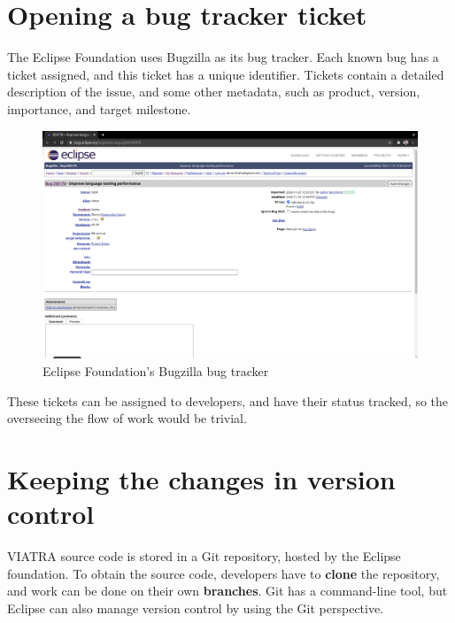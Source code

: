 \documentclass[11pt,a4paper,oneside]{report}
\begin{document}
\section{Opening a bug tracker ticket}
The Eclipse Foundation uses Bugzilla as its bug tracker. Each known bug has a
ticket assigned, and this ticket has a unique identifier. Tickets contain
a detailed description of the issue, and some other metadata, such as product,
version, importance, and target milestone.

\begin{figure}[ht]
\centering
\includegraphics[width=150mm, keepaspectratio]{figures/bugzilla.png}
\caption{Eclipse Foundation's Bugzilla bug tracker}
\label{fig:bugzilla}
\end{figure}

These tickets can be assigned to developers, and have their status tracked, so
the overseeing the flow of work would be trivial.

\section{Keeping the changes in version control}
VIATRA source code is stored in a Git repository, hosted by the Eclipse
foundation. To obtain the source code, developers have to \textbf{clone} the
repository, and work can be done on their own \textbf{branches}. Git has a
command-line tool, but Eclipse can also manage version control by using the
Git perspective.
\end{document}
